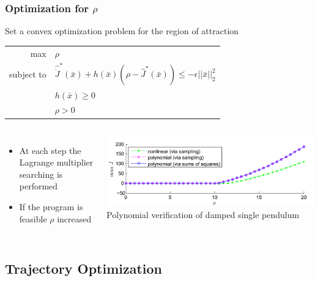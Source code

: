\documentclass{beamer}
\begin{document}

\begin{frame}
\frametitle{Optimization for $\rho$}
Set a convex optimization problem for the region of attraction 
\begin{center}
\begin{tabular}{ r l }
max & $\rho$ \\
subject to & $\hat{\dot{J}}^{\ast}(\bar{x})+ h(\bar{x})(\rho - \hat{J}^{\ast}(\bar{x}))\leq -\epsilon ||\bar{x}||_2^2$\\
 & $h(\bar{x})\geq 0$\\
 & $\rho>0$
\end{tabular}
\end{center}
\begin{columns}[c] 
\begin{itemize}
\item At each step the Lagrange multiplier searching is performed
\item If the program is feasible $\rho$ increased 
\end{itemize}

\centering
 \includegraphics[width=.95\textwidth]{figures/PolynomialVerification.png}\\
\scriptsize{Polynomial verification of damped single pendulum  \cite{p1}}
\end{columns}

\end{frame}


\subsection{Trajectory Optimization}
\end{document}
